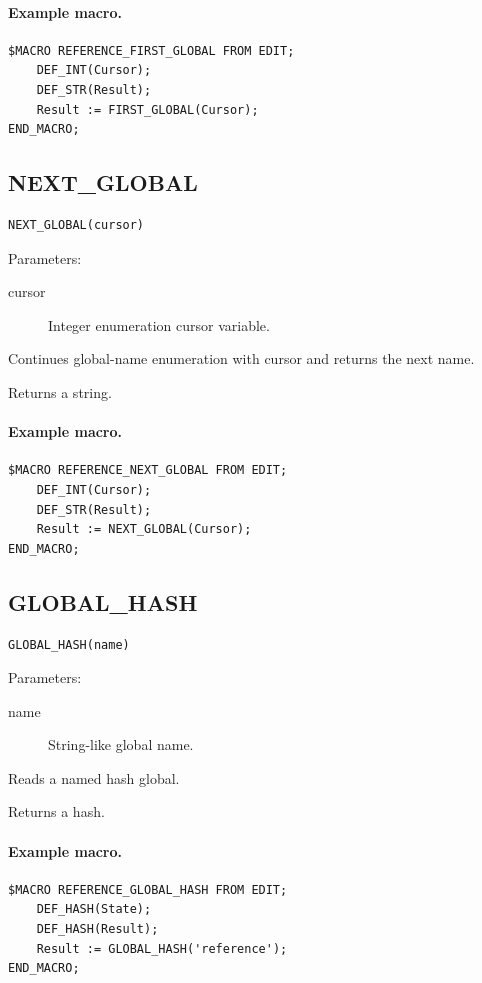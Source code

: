 \documentclass[a4paper,10pt,twoside,openany]{book}
\newenvironment{mrmacextension}{\begin{changebar}}{\end{changebar}}
\begin{document}
\paragraph{Example macro.}
\begin{verbatim}
$MACRO REFERENCE_FIRST_GLOBAL FROM EDIT;
    DEF_INT(Cursor);
    DEF_STR(Result);
    Result := FIRST_GLOBAL(Cursor);
END_MACRO;
\end{verbatim}

\begin{mrmacextension}
\label{prim:intrinsic-next-global}
\subsection*{NEXT\_GLOBAL}
\begin{verbatim}
NEXT_GLOBAL(cursor)
\end{verbatim}
Parameters:
\begin{description}
\item[cursor] Integer enumeration cursor variable.
\end{description}

Continues global-name enumeration with cursor and returns the next name.

Returns a string.

\paragraph{Example macro.}
\begin{verbatim}
$MACRO REFERENCE_NEXT_GLOBAL FROM EDIT;
    DEF_INT(Cursor);
    DEF_STR(Result);
    Result := NEXT_GLOBAL(Cursor);
END_MACRO;
\end{verbatim}
\end{mrmacextension}

\begin{mrmacextension}
\label{prim:intrinsic-global-hash}
\subsection*{GLOBAL\_HASH}
\begin{verbatim}
GLOBAL_HASH(name)
\end{verbatim}
Parameters:
\begin{description}
\item[name] String-like global name.
\end{description}

Reads a named hash global.

Returns a hash.

\paragraph{Example macro.}
\begin{verbatim}
$MACRO REFERENCE_GLOBAL_HASH FROM EDIT;
    DEF_HASH(State);
    DEF_HASH(Result);
    Result := GLOBAL_HASH('reference');
END_MACRO;
\end{verbatim}
\end{mrmacextension}
\end{document}
